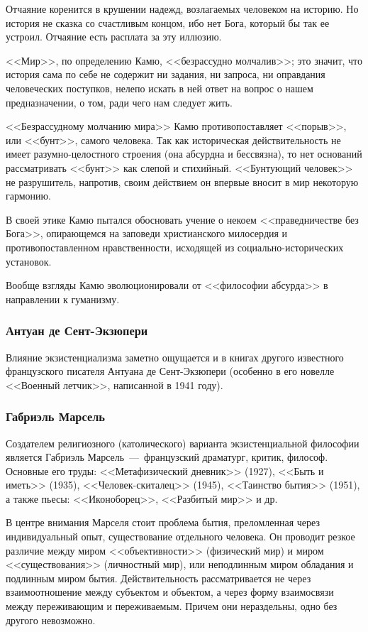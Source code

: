 \documentclass{bmstu}
\begin{document}
Отчаяние коренится в крушении надежд, возлагаемых человеком на историю. Но история не сказка со счастливым концом, ибо нет Бога, который бы так ее устроил. Отчаяние есть расплата за эту иллюзию.

<<Мир>>, по определению Камю, <<безрассудно молчалив>>; это значит, что история сама по себе не содержит ни задания, ни запроса, ни оправдания человеческих поступков, нелепо искать в ней ответ на вопрос о нашем предназначении, о том, ради чего нам следует жить.

<<Безрассудному молчанию мира>> Камю противопоставляет <<порыв>>, или <<бунт>>, самого человека. Так как историческая действительность не имеет разумно-целостного строения (она абсурдна и бессвязна), то нет оснований рассматривать <<бунт>> как слепой и стихийный. <<Бунтующий человек>> не разрушитель, напротив, своим действием он впервые вносит в мир некоторую гармонию.

В своей этике Камю пытался обосновать учение о некоем <<праведничестве без Бога>>, опирающемся на заповеди христианского милосердия и противопоставленном нравственности, исходящей из социально-исторических установок.

Вообще взгляды Камю эволюционировали от <<философии абсурда>> в направлении к гуманизму.

\subsubsection*{Антуан де Сент-Экзюпери}

Влияние экзистенциализма заметно ощущается и в книгах другого известного французского писателя Антуана де Сент-Экзюпери (особенно в его новелле <<Военный летчик>>, написанной в 1941 году).

\subsubsection*{Габриэль Марсель}


Создателем религиозного (католического) варианта экзистенциальной философии является Габриэль Марсель~---~французский драматург, критик, философ. Основные его труды: <<Метафизический дневник>> (1927), <<Быть и иметь>> (1935), <<Человек-скиталец>> (1945), <<Таинство бытия>> (1951), а также пьесы: <<Иконоборец>>, <<Разбитый мир>> и др.

В центре внимания Марселя стоит проблема бытия, преломленная через индивидуальный опыт, существование отдельного человека. Он проводит резкое различие между миром <<объективности>> (физический мир) и миром <<существования>> (личностный мир), или неподлинным миром обладания и подлинным миром бытия. Действительность рассматривается не через взаимоотношение между субъектом и объектом, а через форму взаимосвязи между переживающим и переживаемым. Причем они нераздельны, одно без другого невозможно.
\end{document}
